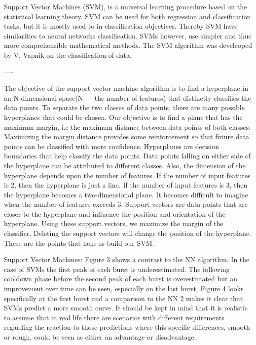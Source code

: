 Support Vector Machines (SVM), is a universal learning procedure based on the statistical learning theory. SVM can be used for both regression and classification tasks, but it is mostly used to in classification objectives. Thereby SVM have similarities to neural networks classification. SVMs however, use simpler and thus more comprehensible mathematical methods. The SVM algorithm was develeoped by V. Vapnik on the classification of data. 

----

The objective of the support vector machine algorithm is to find a hyperplane in an N-dimensional space(N — the number of features) that distinctly classifies the data points.
To separate the two classes of data points, there are many possible hyperplanes that could be chosen. Our objective is to find a plane that has the maximum margin, i.e the maximum distance between data points of both classes. Maximizing the margin distance provides some reinforcement so that future data points can be classified with more confidence.
Hyperplanes are decision boundaries that help classify the data points. Data points falling on either side of the hyperplane can be attributed to different classes. Also, the dimension of the hyperplane depends upon the number of features. If the number of input features is 2, then the hyperplane is just a line. If the number of input features is 3, then the hyperplane becomes a two-dimensional plane. It becomes difficult to imagine when the number of features exceeds 3. Support vectors are data points that are closer to the hyperplane and influence the position and orientation of the hyperplane. Using these support vectors, we maximize the margin of the classifier. Deleting the support vectors will change the position of the hyperplane. These are the points that help us build our SVM.



Support Vector Machines: Figure 3 shows a contrast
to the NN algorithm. In the case of SVMs the first peak of
each burst is underestimated. The following cooldown phase
before the second peak of each burst is overestimated but
an improvement over time can be seen, especially on the
last burst. Figure 4 looks specifically at the first burst and
a comparison to the NN 2 makes it clear that SVMs predict a
more smooth curve. It should be kept in mind that it is realistic
to assume that in real life there are scenarios with different
requirements regarding the reaction to those predictions where
this specific differences, smooth or rough, could be seen as
either an advantage or disadvantage.








